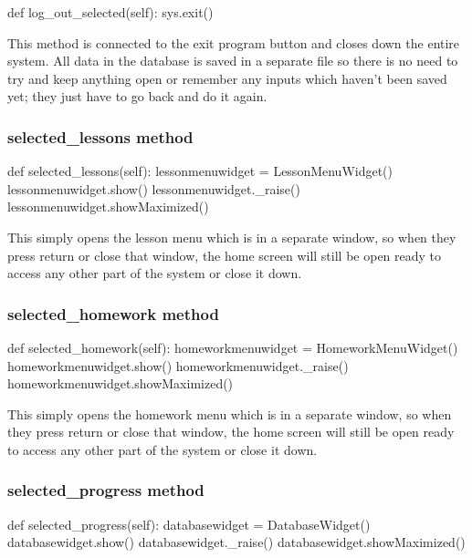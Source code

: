 \begin{python}
def log_out_selected(self):
        sys.exit()
\end{python}

This method is connected to the exit program button and closes down the entire system. All data in the database is saved in a separate file so there is no need to try and keep anything open or remember any inputs which haven't been saved yet; they just have to go back and do it again.

\subsubsection{selected\_lessons method}

\begin{python}
def selected_lessons(self):
        lessonmenuwidget = LessonMenuWidget()
        lessonmenuwidget.show()
        lessonmenuwidget._raise()
        lessonmenuwidget.showMaximized()
\end{python}

This simply opens the lesson menu which is in a separate window, so when they press return or close that window, the home screen will still be open ready to access any other part of the system or close it down.

\subsubsection{selected\_homework method}

\begin{python}
def selected_homework(self):
        homeworkmenuwidget = HomeworkMenuWidget()
        homeworkmenuwidget.show()
        homeworkmenuwidget._raise()
        homeworkmenuwidget.showMaximized()
\end{python}

This simply opens the homework menu which is in a separate window, so when they press return or close that window, the home screen will still be open ready to access any other part of the system or close it down.

\subsubsection{selected\_progress method}

\begin{python}
def selected_progress(self):
        databasewidget = DatabaseWidget()
        databasewidget.show()
        databasewidget._raise()
        databasewidget.showMaximized()  
\end{python}

